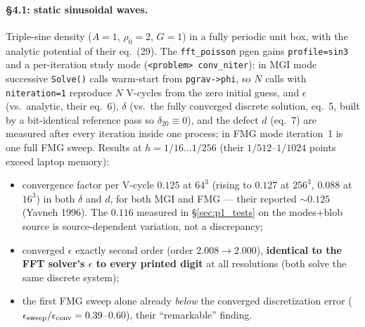 \documentclass[11pt]{article}
\newcommand{\code}[1]{\texttt{#1}}
\begin{document}
\paragraph{\S4.1: static sinusoidal waves.}
Triple-sine density ($A=1$, $\rho_0=2$, $G=1$) in a fully periodic unit box, with
the analytic potential of their eq.~(29). The \code{fft\_poisson} pgen gains
\code{profile=sin3} and a per-iteration study mode (\code{<problem> conv\_niter}):
in MGI mode successive \code{Solve()} calls warm-start from \code{pgrav->phi}, so
$N$ calls with \code{niteration=1} reproduce $N$ V-cycles from the zero initial
guess, and $\epsilon$ (vs.\ analytic, their eq.~6), $\delta$ (vs.\ the fully
converged discrete solution, eq.~5, built by a bit-identical reference pass so
$\delta_{20} \equiv 0$), and the defect $d$ (eq.~7) are measured after every
iteration inside one process; in FMG mode iteration~1 is one full FMG sweep.
Results at $h = 1/16 \ldots 1/256$ (their $1/512$--$1/1024$ points exceed laptop
memory):
\begin{itemize}
  \item convergence factor per V-cycle $0.125$ at $64^3$ (rising to $0.127$ at
        $256^3$, $0.088$ at $16^3$) in both $\delta$ and $d$, for both MGI and FMG
        --- their reported $\sim\!0.125$ (Yavneh 1996). The $0.116$ measured in
        \S\ref{sec:p1_tests} on the modes+blob source is source-dependent
        variation, not a discrepancy;
  \item converged $\epsilon$ exactly second order (order $2.008 \to 2.000$),
        \textbf{identical to the FFT solver's $\epsilon$ to every printed digit}
        at all resolutions (both solve the same discrete system);
  \item the first FMG sweep alone already \emph{below} the converged discretization
        error ($\epsilon_{\rm sweep}/\epsilon_{\rm conv} = 0.39$--$0.60$), their
        ``remarkable'' finding.
\end{itemize}
\end{document}
